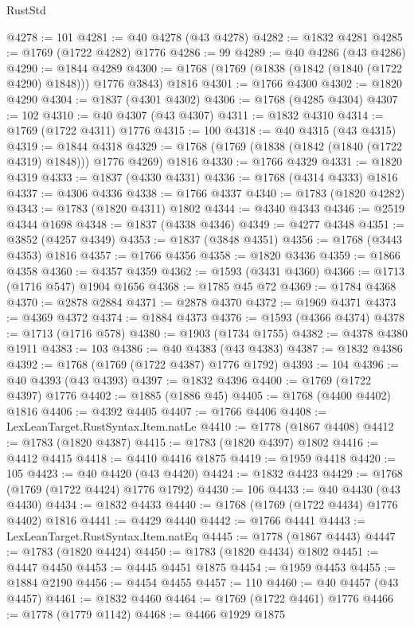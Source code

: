 \begin{lexlean}{RustStd}
\begin{coremodule}
@4278 := 101
@4281 := @40 @4278 (@43 @4278)
@4282 := @1832 @4281
@4285 := @1769 (@1722 @4282) @1776
@4286 := 99
@4289 := @40 @4286 (@43 @4286)
@4290 := @1844 @4289
@4300 := @1768 (@1769 (@1838 (@1842 (@1840 (@1722 @4290) @1848))) @1776 @3843) @1816
@4301 := @1766 @4300
@4302 := @1820 @4290
@4304 := @1837 (@4301 @4302)
@4306 := @1768 (@4285 @4304)
@4307 := 102
@4310 := @40 @4307 (@43 @4307)
@4311 := @1832 @4310
@4314 := @1769 (@1722 @4311) @1776
@4315 := 100
@4318 := @40 @4315 (@43 @4315)
@4319 := @1844 @4318
@4329 := @1768 (@1769 (@1838 (@1842 (@1840 (@1722 @4319) @1848))) @1776 @4269) @1816
@4330 := @1766 @4329
@4331 := @1820 @4319
@4333 := @1837 (@4330 @4331)
@4336 := @1768 (@4314 @4333) @1816
@4337 := @4306 @4336
@4338 := @1766 @4337
@4340 := @1783 (@1820 @4282)
@4343 := @1783 (@1820 @4311) @1802
@4344 := @4340 @4343
@4346 := @2519 @4344 @1698
@4348 := @1837 (@4338 @4346)
@4349 := @4277 @4348
@4351 := @3852 (@4257 @4349)
@4353 := @1837 (@3848 @4351)
@4356 := @1768 (@3443 @4353) @1816
@4357 := @1766 @4356
@4358 := @1820 @3436
@4359 := @1866 @4358
@4360 := @4357 @4359
@4362 := @1593 (@3431 @4360)
@4366 := @1713 (@1716 @547) @1904 @1656
@4368 := @1785 @45 @72
@4369 := @1784 @4368
@4370 := @2878 @2884
@4371 := @2878 @4370
@4372 := @1969 @4371
@4373 := @4369 @4372
@4374 := @1884 @4373
@4376 := @1593 (@4366 @4374)
@4378 := @1713 (@1716 @578)
@4380 := @1903 (@1734 @1755)
@4382 := @4378 @4380 @1911
@4383 := 103
@4386 := @40 @4383 (@43 @4383)
@4387 := @1832 @4386
@4392 := @1768 (@1769 (@1722 @4387) @1776 @1792)
@4393 := 104
@4396 := @40 @4393 (@43 @4393)
@4397 := @1832 @4396
@4400 := @1769 (@1722 @4397) @1776
@4402 := @1885 (@1886 @45)
@4405 := @1768 (@4400 @4402) @1816
@4406 := @4392 @4405
@4407 := @1766 @4406
@4408 := LexLeanTarget.RustSyntax.Item.natLe
@4410 := @1778 (@1867 @4408)
@4412 := @1783 (@1820 @4387)
@4415 := @1783 (@1820 @4397) @1802
@4416 := @4412 @4415
@4418 := @4410 @4416 @1875
@4419 := @1959 @4418
@4420 := 105
@4423 := @40 @4420 (@43 @4420)
@4424 := @1832 @4423
@4429 := @1768 (@1769 (@1722 @4424) @1776 @1792)
@4430 := 106
@4433 := @40 @4430 (@43 @4430)
@4434 := @1832 @4433
@4440 := @1768 (@1769 (@1722 @4434) @1776 @4402) @1816
@4441 := @4429 @4440
@4442 := @1766 @4441
@4443 := LexLeanTarget.RustSyntax.Item.natEq
@4445 := @1778 (@1867 @4443)
@4447 := @1783 (@1820 @4424)
@4450 := @1783 (@1820 @4434) @1802
@4451 := @4447 @4450
@4453 := @4445 @4451 @1875
@4454 := @1959 @4453
@4455 := @1884 @2190
@4456 := @4454 @4455
@4457 := 110
@4460 := @40 @4457 (@43 @4457)
@4461 := @1832 @4460
@4464 := @1769 (@1722 @4461) @1776
@4466 := @1778 (@1779 @1142)
@4468 := @4466 @1929 @1875

\end{coremodule}
\end{lexlean}
